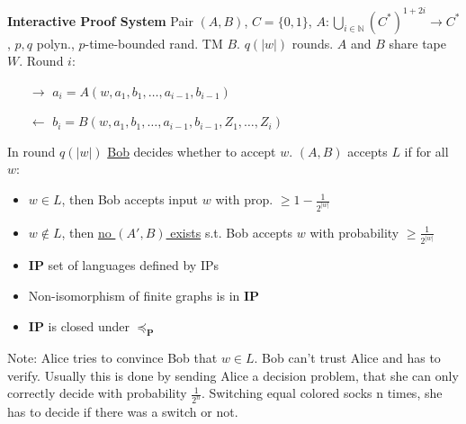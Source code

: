 \documentclass[10pt, twocolumn, parskip=never]{scrartcl}
\newcommand{\fat}[1]{\textbf{#1}}
\newcommand{\newthing}[1]{\fat{\faicon{caret-right} #1}}
\newcommand{\reduce}{\preceq}
\newcommand{\preduce}{\reduce_{\fat{P}}}
\begin{document}
\newthing{Interactive Proof System} Pair $(A, B)$, $C = \{0, 1\}$, $A: \bigcup_{i \in \mathbb{N}}{(C^*)^{1+2i}} \to C^*$, $p,q$ polyn., $p$-time-bounded rand. TM $B$. $q(|w|)$ rounds. $A$ and $B$ share tape $W$. Round $i$:
\vspace{-0.5em}
\begin{itemize}
  \item[$\rightarrow$] $a_i = A(w, a_1, b_1, \dots, a_{i-1}, b_{i-1})$
  \item[$\leftarrow$] $b_i = B(w, a_1, b_1, \dots, a_{i-1}, b_{i-1}, Z_1, \dots, Z_i)$
\end{itemize}
In round $q(|w|)$ \underline{Bob} decides whether to accept $w$. $(A,B)$ accepts $L$ if for all $w$:
\vspace{-0.5em}
\begin{itemize}
  \item $w \in L$, then Bob accepts input $w$ with prop. $\geq 1-\frac{1}{2^{|w|}}$
  \item $w \not \in L$, then \underline{no $(A', B)$ exists} s.t. Bob accepts $w$ with probability $\geq \frac{1}{2^{|w|}}$
\end{itemize}
\begin{itemize}
  \item $\fat{IP}$ set of languages defined by IPs
  \item Non-isomorphism of finite graphs is in $\fat{IP}$
  \item $\fat{IP}$ is closed under $\preduce$
\end{itemize}

Note: Alice tries to convince Bob that $w \in L$. Bob can't trust Alice and has to verify. Usually this is done by sending Alice a decision problem, that she can only correctly decide with probability $\frac{1}{2^n}$. Switching equal colored socks n times, she has to decide if there was a switch or not.

\vspace{0.25em}
\end{document}
